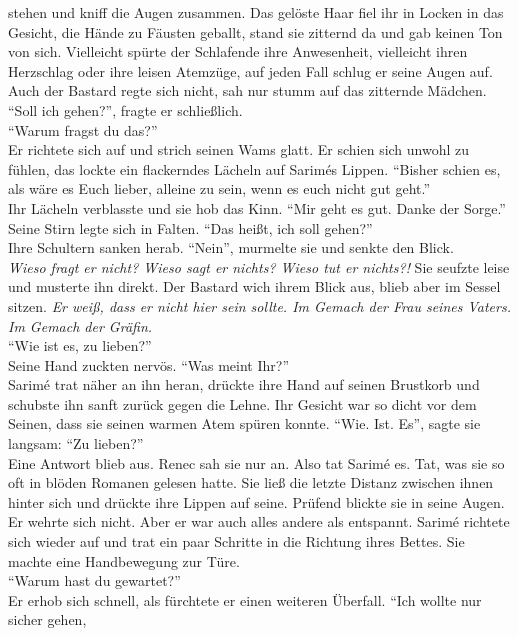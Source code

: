 stehen und kniff die Augen zusammen. Das gelöste Haar fiel ihr in Locken in das Gesicht, die Hände 
zu Fäusten geballt, stand sie zitternd da und gab keinen Ton von sich. Vielleicht spürte der 
Schlafende ihre Anwesenheit, vielleicht ihren Herzschlag oder ihre leisen Atemzüge, auf jeden Fall 
schlug er seine Augen auf. Auch der Bastard regte sich nicht, sah nur stumm auf das zitternde 
Mädchen. \\
``Soll ich gehen?'', fragte er schließlich.\\
``Warum fragst du das?''\\
Er richtete sich auf und strich seinen Wams glatt. Er schien sich unwohl zu fühlen, das lockte ein 
flackerndes Lächeln auf Sarimés Lippen. ``Bisher schien es, als wäre es Euch lieber, alleine zu 
sein, wenn es euch nicht gut geht.''\\
Ihr Lächeln verblasste und sie hob das Kinn. ``Mir geht es gut. Danke der Sorge.''\\
Seine Stirn legte sich in Falten. ``Das heißt, ich soll gehen?''\\
Ihre Schultern sanken herab. ``Nein'', murmelte sie und senkte den Blick.\\
\textit{Wieso fragt er nicht? Wieso sagt er nichts? Wieso tut er nichts?!} Sie seufzte leise und 
musterte ihn direkt. Der Bastard wich ihrem Blick aus, blieb aber im Sessel sitzen. \textit{Er 
weiß, dass er nicht hier sein sollte. Im Gemach der Frau seines Vaters. Im Gemach der Gräfin.}\\
``Wie ist es, zu lieben?''\\
Seine Hand zuckten nervös. ``Was meint Ihr?''\\
Sarimé trat näher an ihn heran, drückte ihre Hand auf seinen Brustkorb und schubste ihn sanft 
zurück gegen die Lehne. Ihr Gesicht war so dicht vor dem Seinen, dass sie seinen warmen Atem spüren 
konnte. ``Wie. Ist. Es'', sagte sie langsam: ``Zu lieben?''\\
Eine Antwort blieb aus. Renec sah sie nur an. Also tat Sarimé es. Tat, was sie so oft in blöden 
Romanen gelesen hatte. Sie ließ die letzte Distanz zwischen ihnen hinter sich und drückte ihre 
Lippen auf seine. Prüfend blickte sie in seine Augen. Er wehrte sich nicht. Aber er war auch alles 
andere als entspannt. Sarimé richtete sich wieder auf und trat ein paar Schritte in die Richtung 
ihres Bettes. Sie machte eine Handbewegung zur Türe. \\
``Warum hast du gewartet?''\\
Er erhob sich schnell, als fürchtete er einen weiteren Überfall. ``Ich wollte nur sicher gehen, 
